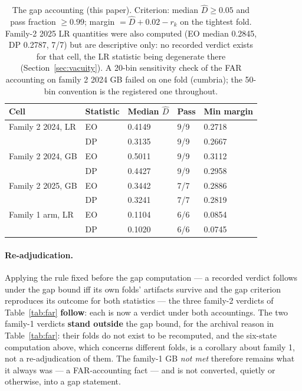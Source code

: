 \documentclass[11pt]{article}
\begin{document}
\begin{table}[h]
\centering
\begin{tabular}{lllll}
\toprule
Cell & Statistic & Median $\hat D$ & Pass & Min margin \\
\midrule
Family 2 2024, LR & EO & 0.4149 & 9/9 & 0.2718 \\
 & DP & 0.3135 & 9/9 & 0.2667 \\
Family 2 2024, GB & EO & 0.5011 & 9/9 & 0.3112 \\
 & DP & 0.4427 & 9/9 & 0.2958 \\
Family 2 2025, GB & EO & 0.3442 & 7/7 & 0.2886 \\
 & DP & 0.3241 & 7/7 & 0.2819 \\
Family 1 arm, LR & EO & 0.1104 & 6/6 & 0.0854 \\
 & DP & 0.1020 & 6/6 & 0.0745 \\
\bottomrule
\end{tabular}
\caption{The gap accounting (this paper). Criterion: median
$\hat D \ge 0.05$ and pass fraction $\ge 0.99$; margin
$= \hat D + 0.02 - r_k$ on the tightest fold. Family-2 2025 LR
quantities were also computed (EO median 0.2845, DP 0.2787, 7/7)
but are descriptive only: no recorded verdict exists for that cell,
the LR statistic being degenerate there
(Section~\ref{sec:vacuity}). A 20-bin sensitivity check of the FAR
accounting on family 2 2024 GB failed on one fold (cumbria); the
50-bin convention is the registered one throughout.}
\label{tab:gap}
\end{table}

\paragraph{Re-adjudication.} Applying the rule fixed before the
gap computation --- a recorded verdict follows under the gap bound
iff its own folds' artifacts survive and the gap criterion
reproduces its outcome for both statistics --- the three family-2
verdicts of Table~\ref{tab:far} \textbf{follow}: each is now a
verdict under both accountings. The two family-1 verdicts
\textbf{stand outside} the gap bound, for the archival reason in
Table~\ref{tab:far}: their folds do not exist to be recomputed,
and the six-state computation above, which concerns different
folds, is a corollary about family 1, not a re-adjudication of
them. The family-1 GB \emph{not met} therefore remains what it
always was --- a FAR-accounting fact --- and is not converted,
quietly or otherwise, into a gap statement.
\end{document}
